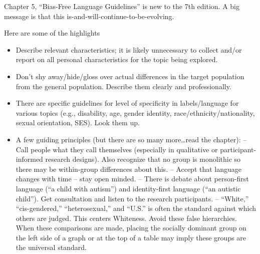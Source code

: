 \documentclass[
  11pt,
]{book}
\providecommand{\tightlist}{%
  \setlength{\itemsep}{0pt}\setlength{\parskip}{0pt}}
\begin{document}
Chapter 5, ``Bias-Free Language Guidelines'' is new to the 7th edition. A big message is that this is-and-will-continue-to-be-evolving.

Here are some of the highlights

\begin{itemize}
\tightlist
\item
  Describe relevant characteristics; it is likely unnecessary to collect and/or report on all personal characteristics for the topic being explored.
\item
  Don't shy away/hide/gloss over actual differences in the target population from the general population. Describe them clearly and professionally.
\item
  There are specific guidelines for level of specificity in labels/language for various topics (e.g., disability, age, gender identity, race/ethnicity/nationality, sexual orientation, SES). Look them up.
\item
  A few guiding principles (but there are so many more\ldots read the chapter):
  -- Call people what they call themselves (especially in qualitative or participant-informed research designs). Also recognize that no group is monolithic so there may be within-group differences about this.
  -- Accept that language changes with time -- stay open minded.
  -- There is debate about person-first language (``a child with autism'') and identity-first language (``an autistic child''). Get consultation and listen to the research participants.
  -- ``White,'' ``cis-gendered,'' ``heterosexual,'' and ``U.S.'' is often the standard against which others are judged. This centers Whiteness. Avoid these false hierarchies. When these comparisons are made, placing the socially dominant group on the left side of a graph or at the top of a table may imply these groups are the universal standard.
\end{itemize}
\end{document}
